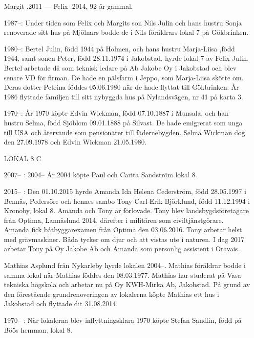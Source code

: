 Margit .2011  ---  Felix .2014, 92 år gammal.


1987--:	Under tiden som Felix och Margits son Nils Julin och hans hustru Sonja renoverade sitt hus på Mjölnars bodde de i Nils föräldrars lokal 7 på Gökbrinken.

1980--:	Bertel Julin, född 1944 på Holmen, och hans hustru Marja-Liisa ,född 1944, samt sonen Peter, född 28.11.1974 i Jakobstad, hyrde lokal 7 av Felix Julin. Bertel arbetade då som teknisk ledare på Ab Jakobe Oy i Jakobstad och blev senare VD för firman. De hade en pälsfarm i Jeppo, som Marja-Liisa skötte om. Deras dotter Petrina föddes 05.06.1980 när de hade flyttat till Gökbrinken. År 1986 flyttade familjen till sitt nybyggda hus på Nylandsvägen, nr 41 på karta 3.

 1970--:
År 1970 köpte Edvin Wickman, född 07.10.1887 i Munsala, och han hustru Selma, född Sjöblom 09.01.1888 på Silvast. De hade emigrerat som unga till USA och återvände som pensionärer till fädernebygden. Selma Wickman dog den 27.09.1978 och Edvin Wickman 21.05.1980.


LOKAL 8 C

 2007-- :
 2004--
År 2004 köpte Paul och Carita Sandström lokal 8.

	2015-- :
Den 01.10.2015 hyrde Amanda Ida Helena Cederström, född 28.05.1997 i Bennäs, Pedersöre och hennes sambo Tony Carl-Erik Björklund, född 11.12.1994 i Kronoby, lokal 8. Amanda och Tony är förlovade. Tony blev landsbygdsföretagare från Optima, Lannäslund 2014, därefter i militären som civiltjänstgörare. Amanda fick båtbyggarexamen från Optima den 03.06.2016. Tony arbetar helst med grävmaskiner. Båda tycker om djur och att vistas ute i naturen. I dag 2017 arbetar Tony på Oy Jakobe Ab och Amanda som personlig assistent i Oravais.

Mathias Asplund från Nykarleby hyrde lokalen 2004--. Mathias föräldrar bodde i samma lokal när Mathias föddes den 08.03.1977. Mathias har studerat på Vasa tekniska högskola och arbetar nu på Oy KWH-Mirka Ab, Jakobstad. På grund av den förestående grundrenoveringen av lokalerna köpte Mathias ett hus i Jakobstad och flyttade dit 31.08.2014.

 1970-- :
När lokalerna blev inflyttningsklara 1970 köpte Stefan Sandlin, född på Böös hemman, lokal 8.

